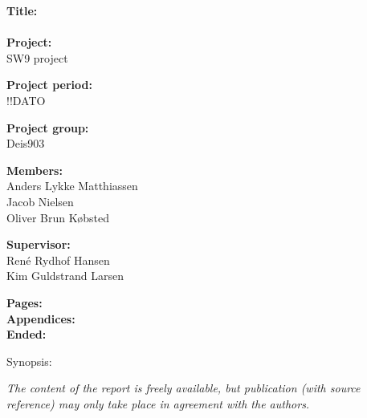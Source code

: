\begin{minipage}[t]{0.48\textwidth}
\textbf{Title:} \\[5pt]\hspace{2ex}
\\

\textbf{Project:} \\[5pt]\bigskip\hspace{2ex}
SW9 project

\textbf{Project period:} \\[5pt]\bigskip\hspace{2ex}
!!DATO

\textbf{Project group:} \\[5pt]\bigskip\hspace{2ex}
Deis903

\textbf{Members:} \\[5pt]\hspace*{2ex}
Anders Lykke Matthiassen \\\hspace*{2ex}
Jacob Nielsen \\\hspace*{2ex}
Oliver Brun Købsted 


\textbf{Supervisor:} \\[5pt]\hspace*{2ex}
René Rydhof Hansen\\
Kim Guldstrand Larsen

\vspace*{1cm}

\textbf{Pages: } \\
\textbf{Appendices: } \\
\textbf{Ended: }

\end{minipage}
\hfill
\begin{minipage}[t]{0.483\textwidth}
Synopsis: \\[5pt]
\fbox{\parbox{7cm}{\bigskip\bigskip}}
\end{minipage}

\vfill

{\footnotesize\itshape The content of the report is freely available, but publication (with source reference) may only take place in agreement with the authors.}
